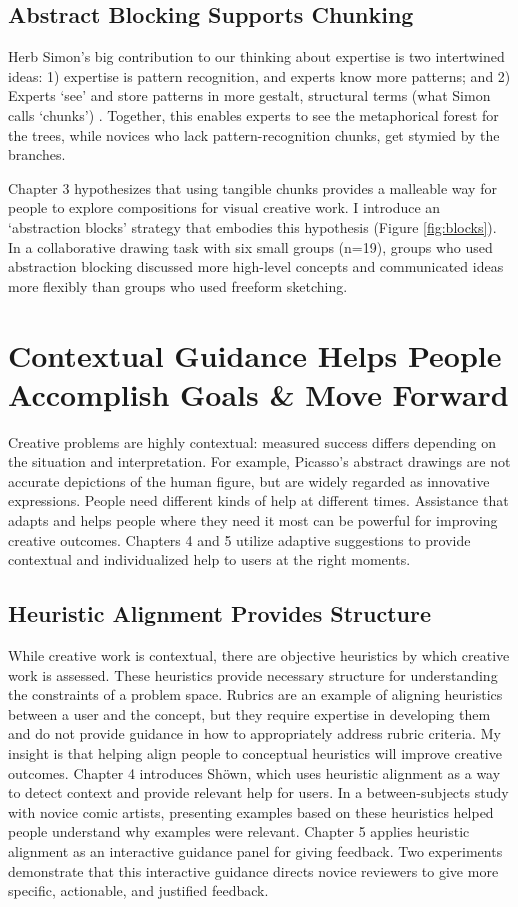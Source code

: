 \subsection{Abstract Blocking Supports Chunking}
Herb Simon’s big contribution to our thinking about expertise is two intertwined ideas: 1) expertise is pattern recognition, and experts know more patterns; and 2) Experts ‘see’ and store patterns in more gestalt, structural terms (what Simon calls ‘chunks’) \cite{Chase1973,Gobet2001,Gobet1998}. Together, this enables experts to see the metaphorical forest for the trees, while novices who lack pattern-recognition chunks, get stymied by the branches.

Chapter 3 hypothesizes that using tangible chunks provides a malleable way for people to explore compositions for visual creative work. I introduce an ‘abstraction blocks’ strategy that embodies this hypothesis (Figure \ref{fig:blocks}). In a collaborative drawing task with six small groups (n=19), groups who used abstraction blocking discussed more high-level concepts and communicated ideas more flexibly than groups who used freeform sketching. 

\section{Contextual Guidance Helps People Accomplish Goals \& Move Forward}
Creative problems are highly contextual: measured success differs depending on the situation and interpretation. For example, Picasso’s abstract drawings are not accurate depictions of the human figure, but are widely regarded as innovative expressions. People need different kinds of help at different times. Assistance that adapts and helps people where they need it most can be powerful for improving creative outcomes. Chapters 4 and 5 utilize adaptive suggestions to provide contextual and individualized help to users at the right moments. 

\subsection{Heuristic Alignment Provides Structure}
While creative work is contextual, there are objective heuristics by which creative work is assessed. These heuristics provide necessary structure for understanding the constraints of a problem space. Rubrics are an example of aligning heuristics between a user and the concept, but they require expertise in developing them and do not provide guidance in how to appropriately address rubric criteria. My insight is that helping align people to conceptual heuristics will improve creative outcomes. Chapter 4 introduces Sh\"{o}wn, which uses heuristic alignment as a way to detect context and provide relevant help for users. In a between-subjects study with novice comic artists, presenting examples based on these heuristics helped people understand why examples were relevant. Chapter 5 applies heuristic alignment as an interactive guidance panel for giving feedback. Two experiments demonstrate that this interactive guidance directs novice reviewers to give more specific, actionable, and justified feedback.

